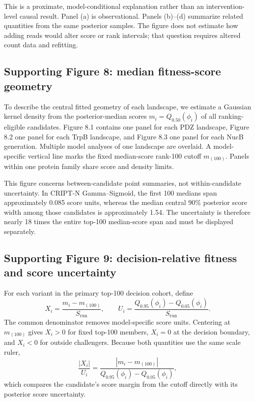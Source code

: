 \documentclass[11pt]{article}
\newcommand{\fit}{\phi}
\begin{document}
This is a proximate, model-conditional explanation rather than an intervention-level causal result. Panel (a) is observational. Panels (b)--(d) summarize related quantities from the same posterior samples. The figure does not estimate how adding reads would alter score or rank intervals; that question requires altered count data and refitting.

\subsection*{Supporting Figure 8: median fitness-score geometry}

To describe the central fitted geometry of each landscape, we estimate a Gaussian kernel density from the posterior-median scores $m_i=Q_{0.50}(\fit_i)$ of all ranking-eligible candidates. Figure 8.1 contains one panel for each PDZ landscape, Figure 8.2 one panel for each TrpB landscape, and Figure 8.3 one panel for each NucB generation. Multiple model analyses of one landscape are overlaid. A model-specific vertical line marks the fixed median-score rank-100 cutoff $m_{(100)}$. Panels within one protein family share score and density limits.

This figure concerns between-candidate point summaries, not within-candidate uncertainty. In CRIPT-N Gamma--Sigmoid, the first 100 medians span approximately 0.085 score units, whereas the median central 90\% posterior score width among those candidates is approximately 1.54. The uncertainty is therefore nearly 18 times the entire top-100 median-score span and must be displayed separately.

\subsection*{Supporting Figure 9: decision-relative fitness and score uncertainty}

For each variant in the primary top-100 decision cohort, define
\[
X_i=\frac{m_i-m_{(100)}}{S_{\mathrm{run}}},
\qquad
U_i=\frac{Q_{0.95}(\fit_i)-Q_{0.05}(\fit_i)}{S_{\mathrm{run}}}.
\]
The common denominator removes model-specific score units. Centering at $m_{(100)}$ gives $X_i>0$ for fixed top-100 members, $X_i=0$ at the decision boundary, and $X_i<0$ for outside challengers. Because both quantities use the same scale ruler,
\[
\frac{|X_i|}{U_i}
=
\frac{|m_i-m_{(100)}|}{Q_{0.95}(\fit_i)-Q_{0.05}(\fit_i)},
\]
which compares the candidate's score margin from the cutoff directly with its posterior score uncertainty.
\end{document}
